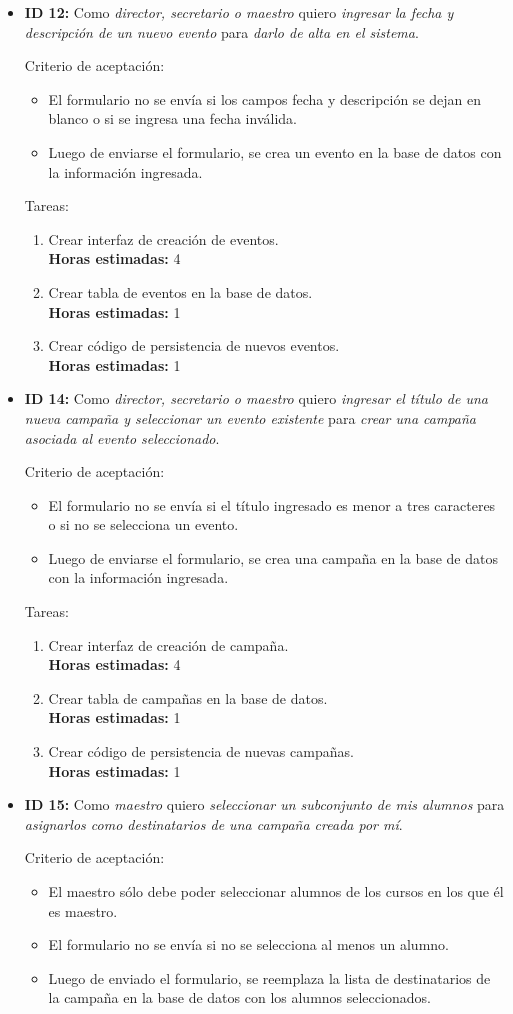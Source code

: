 \documentclass[a4paper, 10pt, twoside]{article}
\newenvironment{stories}{
  \begin{itemize}
}{
  \end{itemize}
}
\newcommand{\storyid}[4]{
  \item
  \textbf{ID #1:} Como \emph{#2} quiero \emph{#3} para \emph{#4}.
}
\newenvironment{tasks}{
  Tareas:
  \begin{enumerate}
}{
  \end{enumerate}
}
\newcommand{\task}[1] {
  \item #1.\\
  \textbf{Horas estimadas:}
}
\newenvironment{criterios}{
  Criterio de aceptación:
  \begin{itemize}
}{
  \end{itemize}
}
\newcommand{\criteria}[1] {
  \item #1
}
\begin{document}
\begin{stories}
  \storyid{12}
          {director, secretario o maestro}
          {ingresar la fecha y descripción de un nuevo evento}
          {darlo de alta en el sistema}

   \begin{criterios}
    \criteria{El formulario no se envía si los campos fecha y descripción se dejan en blanco o si se ingresa una fecha inválida.}
    \criteria{Luego de enviarse el formulario, se crea un evento en la base de datos con la información ingresada.}
  \end{criterios}

  \begin{tasks}
    \task{Crear interfaz de creación de eventos} 4
    \task{Crear tabla de eventos en la base de datos} 1
    \task{Crear código de persistencia de nuevos eventos} 1
  \end{tasks}


  \storyid{14}
          {director, secretario o maestro}
          {ingresar el título de una nueva campaña y seleccionar un evento existente}
          {crear una campaña asociada al evento seleccionado}

   \begin{criterios}
     \criteria{El formulario no se envía si el título ingresado es menor a tres caracteres o si no se selecciona un evento.}
     \criteria{Luego de enviarse el formulario, se crea una campaña en la base de datos con la información ingresada.}
  \end{criterios}

  \begin{tasks}
    \task{Crear interfaz de creación de campaña} 4
    \task{Crear tabla de campañas en la base de datos} 1
    \task{Crear código de persistencia de nuevas campañas} 1
  \end{tasks}


  \storyid{15}
          {maestro}
          {seleccionar un subconjunto de mis alumnos}
          {asignarlos como destinatarios de una campaña creada por mí}

   \begin{criterios}
    \criteria{El maestro sólo debe poder seleccionar alumnos de los cursos en los que él es maestro.}
    \criteria{El formulario no se envía si no se selecciona al menos un alumno.}
    \criteria{Luego de enviado el formulario, se reemplaza la lista de destinatarios de la campaña en la base de datos con los alumnos seleccionados.}
  \end{criterios}



\end{stories}
\end{document}
